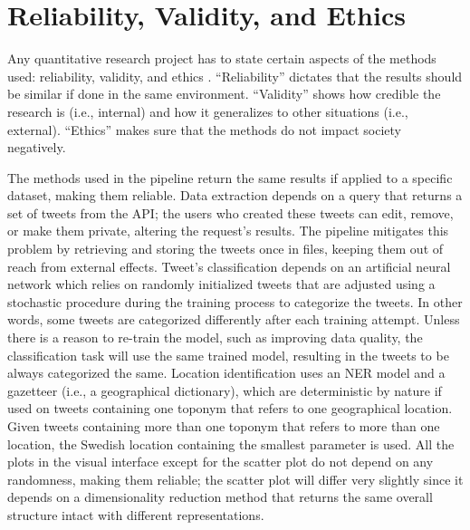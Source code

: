 \section{Reliability, Validity, and Ethics}

Any quantitative research project has to state certain aspects of the methods used: reliability,
validity, and ethics \cite{woodrowReliabilityValidityEthics2014}. ``Reliability'' dictates that the
results should be similar if done in the same environment. ``Validity'' shows how credible the
research is (i.e., internal) and how it generalizes to other situations (i.e., external). ``Ethics''
makes sure that the methods do not impact society negatively. 

The methods used in the pipeline return the same results if applied to a specific dataset, making
them reliable. Data extraction depends on a query that returns a set of tweets from the \ac{API};
the users who created these tweets can edit, remove, or make them private, altering the request's
results. The pipeline mitigates this problem by retrieving and storing the tweets once in files,
keeping them out of reach from external effects. Tweet's classification depends on an artificial
neural network which relies on randomly initialized tweets that are adjusted using a stochastic
procedure during the training process to categorize the tweets. In other words,  some tweets are
categorized differently after each training attempt. Unless there is a reason to re-train the model,
such as improving data quality, the classification task will use the same trained model, resulting
in the tweets to be always categorized the same. Location identification uses an \ac{NER} model and
a gazetteer (i.e., a geographical dictionary), which are deterministic by nature if used on tweets
containing one toponym that refers to one geographical location. Given tweets containing more than
one toponym that refers to more than one location, the Swedish location containing the smallest
parameter is used. All the plots in the visual interface except for the scatter plot do not depend on
any randomness, making them reliable; the scatter plot will differ very slightly since it depends on
a dimensionality reduction method that returns the same overall structure intact with different
representations.

